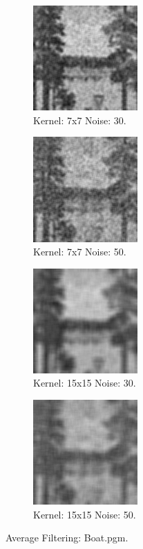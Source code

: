 \documentclass[letterpaper,10pt]{article}
\begin{document}
   \begin{figure}[hbtp]
    \centering
    \begin{subfigure}{4cm}
      \includegraphics[width=4cm]{images/median_boat_average_7_30.png}
      \caption{Kernel: 7x7 Noise: 30.}
    \end{subfigure}
    \begin{subfigure}{4cm}
      \includegraphics[width=4cm]{images/median_boat_average_7_50.png}
      \caption{Kernel: 7x7 Noise: 50.}
    \end{subfigure}
    \begin{subfigure}{4cm}
      \includegraphics[width=4cm]{images/median_boat_average_15_30.png}
      \caption{Kernel: 15x15 Noise: 30.}
    \end{subfigure}
    \begin{subfigure}{4cm}
	\includegraphics[width=4cm]{images/median_boat_average_15_50.png}
      \caption{Kernel: 15x15 Noise: 50.}
    \end{subfigure}
    \caption{Average Filtering: Boat.pgm.}
    \label{fig:averageboat}
  \end{figure}
\end{document}

